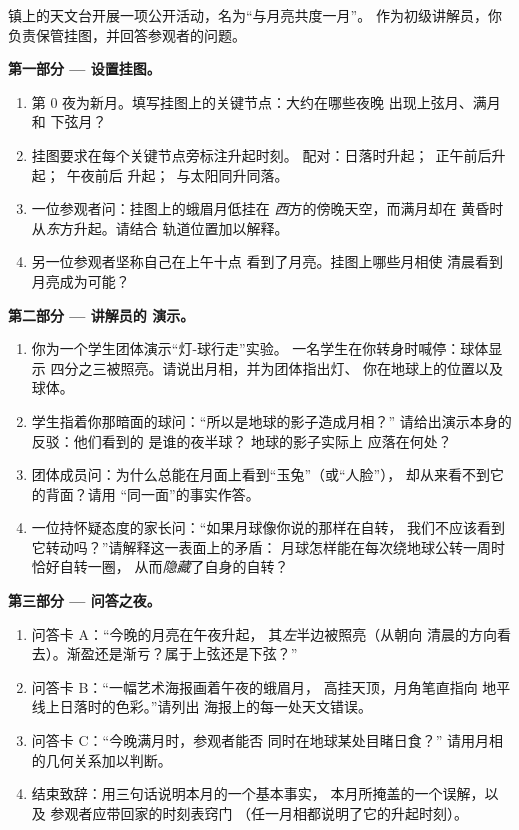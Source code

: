 \begin{problem}\label{pb:g7:moon-phases:1}
镇上的天文台开展一项公开活动，名为“与月亮共度一月”。
作为初级讲解员，你负责保管挂图，并回答参观者的问题。

\medskip\noindent\textbf{第一部分 --- 设置挂图。}
\begin{enumerate}
  \item 第 0 夜为新月。填写挂图上的关键节点：大约在哪些夜晚
        出现上弦月、满月和
        下弦月？
  \item 挂图要求在每个关键节点旁标注升起时刻。
        配对：日落时升起；\ 正午前后升起；\ 午夜前后
        升起；\ 与太阳同升同落。
  \item 一位参观者问：挂图上的蛾眉月低挂在
        \emph{西}方的傍晚天空，而满月却在
        黄昏时从\emph{东}方升起。请结合
        轨道位置加以解释。
  \item 另一位参观者坚称自己在上午十点
        看到了月亮。挂图上哪些月相使
        清晨看到月亮成为可能？
\end{enumerate}

\medskip\noindent\textbf{第二部分 --- 讲解员的
演示。}
\begin{enumerate}[resume]
  \item 你为一个学生团体演示“灯-球行走”实验。
        一名学生在你转身时喊停：球体显示
        四分之三被照亮。请说出月相，并为团体指出灯、
        你在地球上的位置以及球体。
  \item 学生指着你那暗面的球问：“所以是地球的影子造成月相？”
        请给出演示本身的反驳：他们看到的
        是谁的夜半球？
        地球的影子实际上
        应落在何处？
  \item 团体成员问：为什么总能在月面上看到“玉兔”（或“人脸”），
        却从来看不到它的背面？请用
        “同一面”的事实作答。
  \item 一位持怀疑态度的家长问：“如果月球像你说的那样在自转，
        我们不应该看到它转动吗？”请解释这一表面上的矛盾：
        月球怎样能在每次绕地球公转一周时恰好自转一圈，
        从而\emph{隐藏}了自身的自转？
\end{enumerate}

\medskip\noindent\textbf{第三部分 --- 问答之夜。}
\begin{enumerate}[resume]
  \item 问答卡 A：“今晚的月亮在午夜升起，
        其\emph{左}半边被照亮（从朝向
        清晨的方向看去）。渐盈还是渐亏？属于上弦还是下弦？”
  \item 问答卡 B：“一幅艺术海报画着午夜的蛾眉月，
        高挂天顶，月角笔直指向
        地平线上日落时的色彩。”请列出
        海报上的每一处天文错误。
  \item 问答卡 C：“今晚满月时，参观者能否
        同时在地球某处目睹日食？”
        请用月相的几何关系加以判断。
  \item 结束致辞：用三句话说明本月的一个基本事实，
        本月所掩盖的一个误解，以及
        参观者应带回家的时刻表窍门
        （任一月相都说明了它的升起时刻）。
\end{enumerate}
\end{problem}
